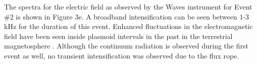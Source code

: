 The spectra for the electric field as observed by the Waves instrument for Event \#2 is shown in Figure 3e. A broadband intensification can be seen between 1-3 kHz for the duration of this event. Enhanced fluctuations in the electromagnetic field have been seen inside plasmoid intervals in the past in the terrestrial magnetosphere \cite{Kennel1986PlasmaRopes}. Although the continuum radiation is observed during the first event as well, no transient intensification was observed due to the flux rope.
